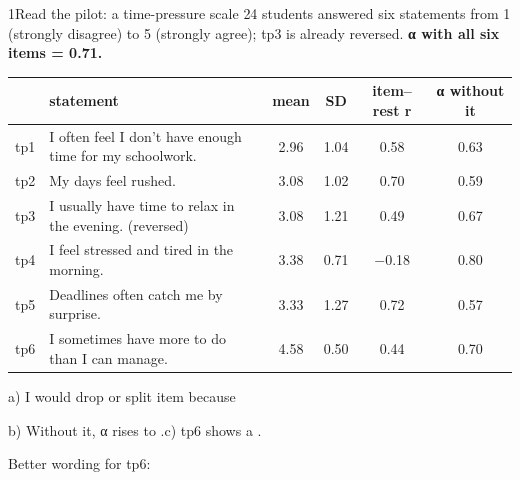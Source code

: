 \begin{wsbox}{1}{Read the pilot: a time-pressure scale}
{\small 24 students answered six statements from 1 (strongly disagree) to 5 (strongly agree); tp3 is already reversed. \textbf{α with all six items = 0.71.}}\par\vspace{0.8mm}
\renewcommand{\arraystretch}{1.05}
{\small
\begin{tabularx}{\linewidth}{@{}l X c c c c@{}}
\arrayrulecolor{rule}\toprule
 & \textbf{statement} & \textbf{mean} & \textbf{SD} & \textbf{item–rest r} & \textbf{α without it}\\\midrule
tp1 & I often feel I don’t have enough time for my schoolwork. & 2.96 & 1.04 & 0.58 & 0.63\\
tp2 & My days feel rushed. & 3.08 & 1.02 & 0.70 & 0.59\\
tp3 & I usually have time to relax in the evening. \textcolor{muted}{(reversed)} & 3.08 & 1.21 & 0.49 & 0.67\\
tp4 & I feel stressed and tired in the morning. & 3.38 & 0.71 & $-$0.18 & 0.80\\
tp5 & Deadlines often catch me by surprise. & 3.33 & 1.27 & 0.72 & 0.57\\
tp6 & I sometimes have more to do than I can manage. & 4.58 & 0.50 & 0.44 & 0.70\\\bottomrule
\end{tabularx}}
\par\vspace{0.5mm}{\scriptsize\textcolor{muted}{tp6: 10 students ticked 4, 14 ticked 5, nobody ticked 1, 2 or 3.}}\par\vspace{0.5mm}
\begin{lueckentext}
a) I would drop or split item  because\par
{}
b) Without it, α rises to .\quad c) tp6 shows a .\par
Better wording for tp6: 
\end{lueckentext}
\end{wsbox}

